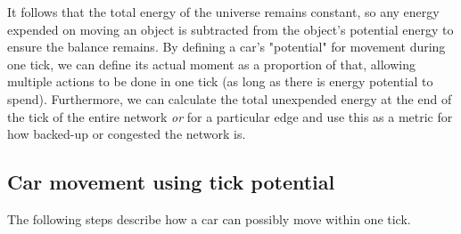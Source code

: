 \noindent It follows that the total energy of the universe remains constant, so any energy expended on moving an object is subtracted from the object's potential energy to ensure the balance remains.  By defining a car's "potential" for movement during one tick, we can define its actual moment as a proportion of that, allowing multiple actions to be done in one tick (as long as there is energy potential to spend).  Furthermore, we can calculate the total unexpended energy at the end of the tick of the entire network \textit{or} for a particular edge and use this as a metric for how backed-up or congested the network is. \\

\subsection{Car movement using tick potential}
\par The following steps describe how a car can possibly move within one tick.
